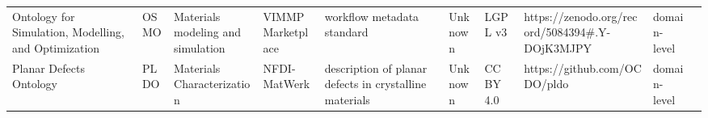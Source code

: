 \begin{tabular}{llllllllll}
                             Ontology for Simulation, Modelling, and Optimization &                    OSMO &           Materials modeling and simulation &                                                                                                                                                                                                                                                                                                                                                    VIMMP Marketplace &                                                                                                                                                                                                                                                                                                                                                                             workflow metadata standard &                                                                                                            Unknown &                                      LGPL v3 &                                                     https://zenodo.org/record/5084394#.Y-DOjK3MJPY &      domain-level \\
                                                          Planar Defects Ontology &                    PLDO &                  Materials Characterization &                                                                                                                                                                                                                                                                                                                                                         NFDI-MatWerk &                                                                                                                                                                                                                                                                                                                                                 description of planar defects in crystalline materials &                                                                                                            Unknown &                                    CC BY 4.0 &                                                                       https://github.com/OCDO/pldo &      domain-level \\

\end{tabular}

